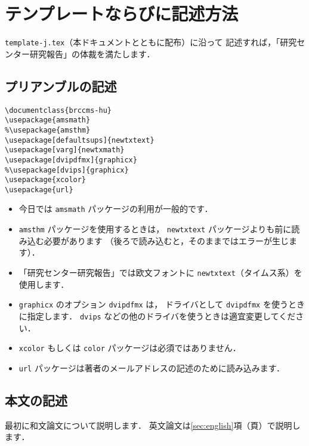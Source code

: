 \documentclass{brccms-hu}
\begin{document}
\section{テンプレートならびに記述方法}%

\texttt{template-j.tex}（本ドキュメントとともに配布）に沿って
記述すれば，「研究センター研究報告」の体裁を満たします．

\makeatletter
\if@english
\makeatother
\else
\newpage
\fi

\subsection{プリアンブルの記述}

\begin{verbatim}
\documentclass{brccms-hu}
\usepackage{amsmath}
%\usepackage{amsthm}
\usepackage[defaultsups]{newtxtext}
\usepackage[varg]{newtxmath}
\usepackage[dvipdfmx]{graphicx}
%\usepackage[dvips]{graphicx}
\usepackage{xcolor}
\usepackage{url}
\end{verbatim}

\begin{itemize}
\item
今日では \texttt{amsmath} パッケージの利用が一般的です．
\item 
\texttt{amsthm} パッケージを使用するときは，
\texttt{newtxtext} パッケージよりも前に読み込む必要があります
（後ろで読み込むと，そのままではエラーが生じます）．
\item 
「研究センター研究報告」では欧文フォントに
\texttt{newtxtext}（タイムス系）を使用します．
\item
\verb/graphicx/ のオプション \texttt{dvipdfmx} は，
ドライバとして \texttt{dvipdfmx} を使うときに指定します．
\texttt{dvips} などの他のドライバを使うときは適宜変更してください．
\item
\texttt{xcolor} もしくは \texttt{color} パッケージは必須ではありません．
\item 
\texttt{url} パッケージは著者のメールアドレスの記述のために読み込みます．
\end{itemize}

\subsection{本文の記述}

最初に和文論文について説明します．
英文論文は\ref{sec:english}項（\pageref{sec:english}頁）で説明します．
\end{document}
